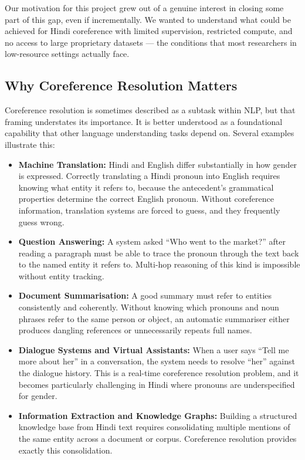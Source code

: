 \documentclass[12pt,a4paper]{report}
\begin{document}
Our motivation for this project grew out of a genuine interest in closing some part of this gap, even if incrementally. We wanted to understand what could be achieved for Hindi coreference with limited supervision, restricted compute, and no access to large proprietary datasets --- the conditions that most researchers in low-resource settings actually face.

\subsection{Why Coreference Resolution Matters}

Coreference resolution is sometimes described as a subtask within NLP, but that framing understates its importance. It is better understood as a foundational capability that other language understanding tasks depend on. Several examples illustrate this:

\begin{itemize}
    \item \textbf{Machine Translation:} Hindi and English differ substantially in how gender is expressed. Correctly translating a Hindi pronoun into English requires knowing what entity it refers to, because the antecedent's grammatical properties determine the correct English pronoun. Without coreference information, translation systems are forced to guess, and they frequently guess wrong.

    \item \textbf{Question Answering:} A system asked ``Who went to the market?'' after reading a paragraph must be able to trace the pronoun through the text back to the named entity it refers to. Multi-hop reasoning of this kind is impossible without entity tracking.

    \item \textbf{Document Summarisation:} A good summary must refer to entities consistently and coherently. Without knowing which pronouns and noun phrases refer to the same person or object, an automatic summariser either produces dangling references or unnecessarily repeats full names.

    \item \textbf{Dialogue Systems and Virtual Assistants:} When a user says ``Tell me more about her'' in a conversation, the system needs to resolve ``her'' against the dialogue history. This is a real-time coreference resolution problem, and it becomes particularly challenging in Hindi where pronouns are underspecified for gender.

    \item \textbf{Information Extraction and Knowledge Graphs:} Building a structured knowledge base from Hindi text requires consolidating multiple mentions of the same entity across a document or corpus. Coreference resolution provides exactly this consolidation.
\end{itemize}
\end{document}
